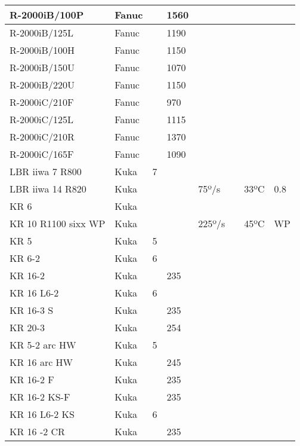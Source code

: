 \begin{longtable}{|p{}|p{}|p{}|p{}|p{}|p{}|p{}|p{}|}
R-2000iB/100P & Fanuc &  & \cellcolor{red} 1560 &  &  &  &  \\ \hline
R-2000iB/125L & Fanuc &  & \cellcolor{red} 1190 &  &  &  &  \\ \hline
R-2000iB/100H & Fanuc &  & \cellcolor{red} 1150 &  &  &  &  \\ \hline
R-2000iB/150U & Fanuc &  & \cellcolor{red} 1070 &  &  &  &  \\ \hline
R-2000iB/220U & Fanuc &  & \cellcolor{red} 1150 &  &  &  &  \\ \hline
R-2000iC/210F & Fanuc &  & \cellcolor{red} 970 &  &  &  &  \\ \hline
R-2000iC/125L & Fanuc &  & \cellcolor{red} 1115 &  &  &  &  \\ \hline
R-2000iC/210R & Fanuc &  & \cellcolor{red} 1370 &  &  &  &  \\ \hline
R-2000iC/165F & Fanuc &  & \cellcolor{red} 1090 &  &  &  &  \\ \hline
LBR iiwa 7 R800 & Kuka & \cellcolor{red} 7 &  &  &  &  &  \\ \hline
\cellcolor{yellow} LBR iiwa 14 R820 & Kuka &  &  & 75º/s &  & \cellcolor{red} 33ºC & \cellcolor{red} 0.8 \\ \hline
KR 6 & Kuka &  &  &  &  &  &  \\ \hline
\cellcolor{green} KR 10 R1100 sixx WP & Kuka &  &  & 225º/s &  & 45ºC & WP \\ \hline
KR 5 & Kuka & \cellcolor{red} 5 &  &  &  &  &  \\ \hline
KR 6-2 & Kuka & \cellcolor{red} 6 &  &  &  &  &  \\ \hline
KR 16-2 & Kuka &  & \cellcolor{red} 235 &  &  &  &  \\ \hline
KR 16 L6-2 & Kuka & \cellcolor{red} 6 &  &  &  &  &  \\ \hline
KR 16-3 S & Kuka &  & \cellcolor{red} 235 &  &  &  &  \\ \hline
KR 20-3 & Kuka &  & \cellcolor{red} 254 &  &  &  &  \\ \hline
KR 5-2 arc HW & Kuka & \cellcolor{red} 5 &  &  &  &  &  \\ \hline
KR 16 arc HW & Kuka &  & \cellcolor{red} 245 &  &  &  &  \\ \hline
KR 16-2 F & Kuka &  & \cellcolor{red} 235 &  &  &  &  \\ \hline
KR 16-2 KS-F & Kuka &  & \cellcolor{red} 235 &  &  &  &  \\ \hline
KR 16 L6-2 KS & Kuka & \cellcolor{red} 6 &  &  &  &  &  \\ \hline
KR 16 -2 CR & Kuka &  & \cellcolor{red} 235 &  &  &  &  \\ \hline

\end{longtable}
